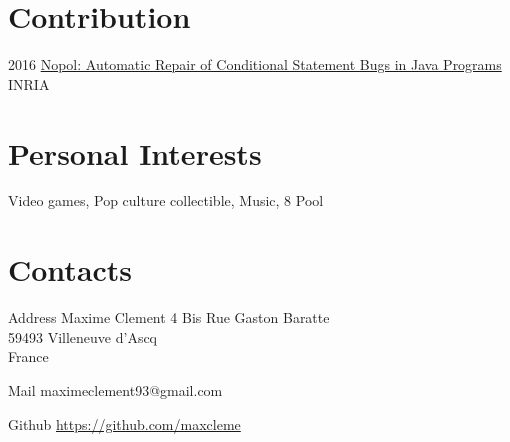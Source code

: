 \documentclass[hidelinks]{cv-style}          %
\begin{document}


\section{Contribution}
\begin{entrylist}

\entry
{2016}
{\href{https://hal.archives-ouvertes.fr/hal-01285008}{Nopol: Automatic Repair of Conditional Statement Bugs in Java Programs}}
{INRIA}
{\vspace{-0.3cm}}

\end{entrylist}
\leavevmode\newline



\section{Personal Interests}
\begin{entrylist}
\entry
{Video games, Pop culture collectible, Music, 8 Pool}
{}
{}
{\vspace{-0.3cm}}	
\end{entrylist}
\leavevmode\newline


\section{Contacts}

\begin{entrylist}
\entry
  {Address}
  {Maxime Clement}
  {}
  {
  4 Bis Rue Gaston Baratte\\
59493 Villeneuve d'Ascq\\ 
France\\
}

\entry
  {Mail}
  {maximeclement93@gmail.com}
  {}
  {}
  
\entry
  {Github}
  {\url{https://github.com/maxcleme}}
  {}
  {}
\end{entrylist}
\end{document}
